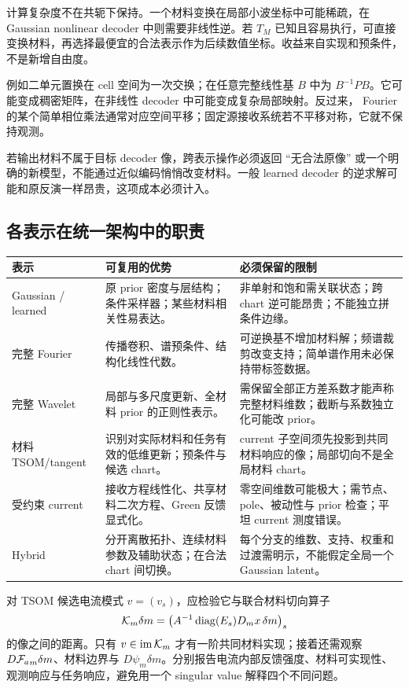 计算复杂度不在共轭下保持。一个材料变换在局部小波坐标中可能稀疏，在 Gaussian nonlinear decoder 中则需要非线性逆。若 $T_M$ 已知且容易执行，可直接变换材料，再选择最便宜的合法表示作为后续数值坐标。收益来自实现和预条件，不是新增自由度。

例如二单元置换在 cell 空间为一次交换；在任意完整线性基 $B$ 中为 $B^{-1}PB$。它可能变成稠密矩阵，在非线性 decoder 中可能变成复杂局部映射。反过来， Fourier 的某个简单相位乘法通常对应空间平移；固定源接收系统若不平移对称，它就不保持观测。

若输出材料不属于目标 decoder 像，跨表示操作必须返回 ``无合法原像'' 或一个明确的新模型，不能通过近似编码悄悄改变材料。一般 learned decoder 的逆求解可能和原反演一样昂贵，这项成本必须计入。

\subsection{各表示在统一架构中的职责}

\begin{longtable}{p{}p{}p{}}
\toprule 表示 & 可复用的优势 & 必须保留的限制\\\midrule\endhead
Gaussian / learned & 原 prior 密度与层结构；条件采样器；某些材料相关性易表达。 & 非单射和饱和需关联状态；跨 chart 逆可能昂贵；不能独立拼条件边缘。\\
完整 Fourier & 传播卷积、谱预条件、结构化线性代数。 & 可逆换基不增加材料解；频谱裁剪改变支持；简单谱作用未必保持带标签数据。\\
完整 Wavelet & 局部与多尺度更新、全材料 prior 的正则性表示。 & 需保留全部正方差系数才能声称完整材料维数；截断与系数独立化可能改 prior。\\
材料 TSOM/tangent & 识别对实际材料和任务有效的低维更新；预条件与候选 chart。 & current 子空间须先投影到共同材料响应的像；局部切向不是全局材料 chart。\\
受约束 current & 接收方程线性化、共享材料二次方程、Green 反馈显式化。 & 零空间维数可能极大；需节点、pole、被动性与 prior 检查；平坦 current 测度错误。\\
Hybrid & 分开离散拓扑、连续材料参数及辅助状态；在合法 chart 间切换。 & 每个分支的维数、支持、权重和过渡需明示，不能假定全局一个 Gaussian latent。\\\bottomrule
\end{longtable}

对 TSOM 候选电流模式 $v=(v_s)$，应检验它与联合材料切向算子
\begin{equation}
\mathcal K_m\delta m
=\left(A^{-1}\operatorname{diag}(E_s)D_mx\,\delta m\right)_s
\end{equation}
的像之间的距离。只有 $v\in\operatorname{im}\mathcal K_m$ 才有一阶共同材料实现；接着还需观察 $D{\mathcal F_a}_m\delta m$、材料边界与 $D\psi_m\delta m$。分别报告电流内部反馈强度、材料可实现性、观测响应与任务响应，避免用一个 singular value 解释四个不同问题。

